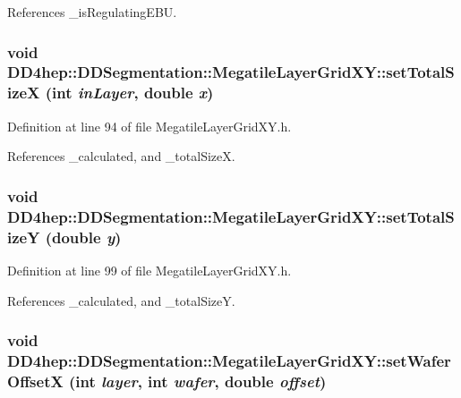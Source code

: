 References \_\-isRegulatingEBU.\hypertarget{class_d_d4hep_1_1_d_d_segmentation_1_1_megatile_layer_grid_x_y_a280c3a98334f9c11ceb580d27b03bf70}{
\subsubsection[{setTotalSizeX}]{\setlength{\rightskip}{0pt plus 5cm}void DD4hep::DDSegmentation::MegatileLayerGridXY::setTotalSizeX (int {\em inLayer}, \/  double {\em x})}}
\label{class_d_d4hep_1_1_d_d_segmentation_1_1_megatile_layer_grid_x_y_a280c3a98334f9c11ceb580d27b03bf70}


Definition at line 94 of file MegatileLayerGridXY.h.

References \_\-calculated, and \_\-totalSizeX.\hypertarget{class_d_d4hep_1_1_d_d_segmentation_1_1_megatile_layer_grid_x_y_ae87f5055295fe08dc28352c996bd9a0f}{
\subsubsection[{setTotalSizeY}]{\setlength{\rightskip}{0pt plus 5cm}void DD4hep::DDSegmentation::MegatileLayerGridXY::setTotalSizeY (double {\em y})}}
\label{class_d_d4hep_1_1_d_d_segmentation_1_1_megatile_layer_grid_x_y_ae87f5055295fe08dc28352c996bd9a0f}


Definition at line 99 of file MegatileLayerGridXY.h.

References \_\-calculated, and \_\-totalSizeY.\hypertarget{class_d_d4hep_1_1_d_d_segmentation_1_1_megatile_layer_grid_x_y_a8683c7d9ed5d4b02f79748d1bb16d935}{
\subsubsection[{setWaferOffsetX}]{\setlength{\rightskip}{0pt plus 5cm}void DD4hep::DDSegmentation::MegatileLayerGridXY::setWaferOffsetX (int {\em layer}, \/  int {\em wafer}, \/  double {\em offset})}}
\label{class_d_d4hep_1_1_d_d_segmentation_1_1_megatile_layer_grid_x_y_a8683c7d9ed5d4b02f79748d1bb16d935}



